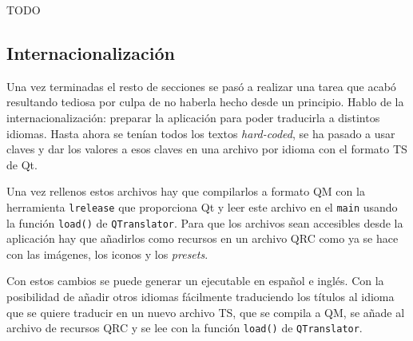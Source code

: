 TODO

\subsection{Internacionalización}

Una vez terminadas el resto de secciones se pasó a realizar una tarea que acabó resultando tediosa por culpa de no haberla hecho desde un principio. Hablo de la internacionalización: preparar la aplicación para poder traducirla a distintos idiomas. Hasta ahora se tenían todos los textos \textit{hard-coded}, se ha pasado a usar claves y dar los valores a esos claves en una archivo por idioma con el formato TS de Qt.

Una vez rellenos estos archivos hay que compilarlos a formato QM con la herramienta \texttt{lrelease} que proporciona Qt y leer este archivo en el \texttt{main} usando la función \texttt{load()} de \texttt{QTranslator}. Para que los archivos sean accesibles desde la aplicación hay que añadirlos como recursos en un archivo QRC como ya se hace con las imágenes, los iconos y los \textit{presets}.

Con estos cambios se puede generar un ejecutable en español e inglés. Con la posibilidad de añadir otros idiomas fácilmente traduciendo los títulos al idioma que se quiere traducir en un nuevo archivo TS, que se compila a QM, se añade al archivo de recursos QRC y se lee con la función \texttt{load()} de \texttt{QTranslator}.